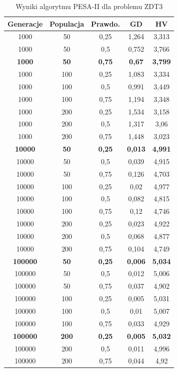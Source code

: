 \documentclass{classrep}
\begin{document}
\begin{table}[H]
\centering
\caption{Wyniki algorytmu PESA-II dla problemu ZDT3}
\label{tab:PESAII_ZDT3}
\begin{tabular}{|ccc|c|c|}
\hline
\textbf{Generacje} & \textbf{Populacja} & \textbf{Prawdo.} & \textbf{GD} & \textbf{HV} \\ \hline
1000 & 50 & 0,25 & 1,264 & 3,313 \\ \hline
1000 & 50 & 0,5 & 0,752 & 3,766 \\ \hline
\textbf{1000} & \textbf{50} & \textbf{0,75} & \textbf{0,67} & \textbf{3,799} \\ \hline
1000 & 100 & 0,25 & 1,083 & 3,334 \\ \hline
1000 & 100 & 0,5 & 0,991 & 3,449 \\ \hline
1000 & 100 & 0,75 & 1,194 & 3,348 \\ \hline
1000 & 200 & 0,25 & 1,534 & 3,158 \\ \hline
1000 & 200 & 0,5 & 1,317 & 3,06 \\ \hline
1000 & 200 & 0,75 & 1,448 & 3,023 \\ \hline
\textbf{10000} & \textbf{50} & \textbf{0,25} & \textbf{0,013} & \textbf{4,991} \\ \hline
10000 & 50 & 0,5 & 0,039 & 4,915 \\ \hline
10000 & 50 & 0,75 & 0,126 & 4,703 \\ \hline
10000 & 100 & 0,25 & 0,02 & 4,977 \\ \hline
10000 & 100 & 0,5 & 0,082 & 4,815 \\ \hline
10000 & 100 & 0,75 & 0,12 & 4,746 \\ \hline
10000 & 200 & 0,25 & 0,023 & 4,922 \\ \hline
10000 & 200 & 0,5 & 0,068 & 4,877 \\ \hline
10000 & 200 & 0,75 & 0,104 & 4,749 \\ \hline
\textbf{100000} & \textbf{50} & \textbf{0,25} & \textbf{0,006} & \textbf{5,034} \\ \hline
100000 & 50 & 0,5 & 0,012 & 5,006 \\ \hline
100000 & 50 & 0,75 & 0,037 & 4,902 \\ \hline
100000 & 100 & 0,25 & 0,005 & 5,031 \\ \hline
100000 & 100 & 0,5 & 0,01 & 5,007 \\ \hline
100000 & 100 & 0,75 & 0,033 & 4,929 \\ \hline
\textbf{100000} & \textbf{200} & \textbf{0,25} & \textbf{0,005} & \textbf{5,032} \\ \hline
100000 & 200 & 0,5 & 0,011 & 4,996 \\ \hline
100000 & 200 & 0,75 & 0,044 & 4,92 \\ \hline
\end{tabular}
\end{table}
\end{document}

